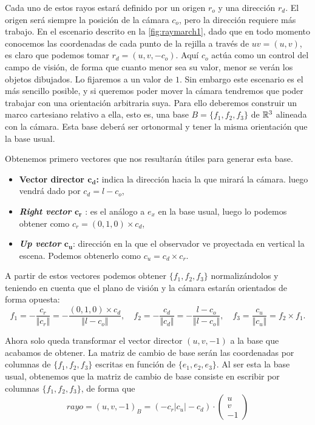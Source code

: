 Cada uno de estos rayos estará definido por un origen $r_o$ y una dirección $r_d$. El origen será siempre la posición de la cámara $c_o$, pero la dirección requiere más trabajo. En el escenario descrito en la \autoref{fig:raymarch1}, dado que en todo momento conocemos las coordenadas de cada punto de la rejilla a través de $uv = (u,v)$, es claro que podemos tomar $r_d = (u,v,-c_o)$. Aquí $c_o$ actúa como un control del campo de visión, de forma que cuanto menor sea su valor, menor se verán los objetos dibujados. Lo fijaremos a un valor de $1$. Sin embargo este escenario es el más sencillo posible, y si queremos poder mover la cámara tendremos que poder trabajar con una orientación arbitraria suya. Para ello deberemos construir un marco cartesiano relativo a ella, esto es, una base $B=\{f_1,f_2,f_3\}$ de $\mathbb{R}^3$ alineada con la cámara. Esta base deberá ser ortonormal y tener la misma orientación que la base usual. 

Obtenemos primero vectores que nos resultarán útiles para generar esta base.

\begin{itemize}
    \item \textbf{Vector director $\boldsymbol{c_d}$:} indica la dirección hacia la que mirará la cámara. luego vendrá dado por $c_d = l-c_o$,
    \item \textbf{\textit{Right vector} $\boldsymbol{c_r}$ }: es el análogo a $e_x$ en la base usual, luego lo podemos obtener como $c_r = (0,1,0)\times c_d$,
    \item \textbf{\textit{Up vector} $\boldsymbol{c_u}$}: dirección en la que el observador ve proyectada en vertical la escena. Podemos obtenerlo como $c_u = c_d\times c_r$.
\end{itemize}

A partir de estos vectores podemos obtener $\{f_1,f_2,f_3\}$ normalizándolos y teniendo en cuenta que el plano de visión y la cámara estarán orientados de forma opuesta:
\begin{equation*}
    f_1 = -\frac{c_r}{\Vert c_r\Vert} = -\frac{(0,1,0)\times c_d}{\Vert l-c_o\Vert},\quad 
    f_2 = -\frac{c_d}{\Vert c_d\Vert} = -\frac{l-c_o}{\Vert l-c_o\Vert},\quad 
    f_3 = \frac{c_u}{\Vert c_u\Vert } = f_2\times f_1.   
\end{equation*}

Ahora solo queda transformar el vector director $(u,v,-1)$ a la base que acabamos de obtener. La matriz de cambio de base serán las coordenadas por columnas de $\{f_1,f_2,f_3\}$ escritas en función de $\{e_1,e_2,e_3\}$. Al ser esta la base usual, obtenemos que la matriz de cambio de base consiste en escribir por columnas $\{f_1,f_2,f_3\}$, de forma que
\begin{equation*}
    rayo = (u,v,-1)_{B} = (-c_r \vert c_u \vert -c_d) \cdot \begin{pmatrix}
        u\\
        v\\
        -1
    \end{pmatrix}
\end{equation*}

